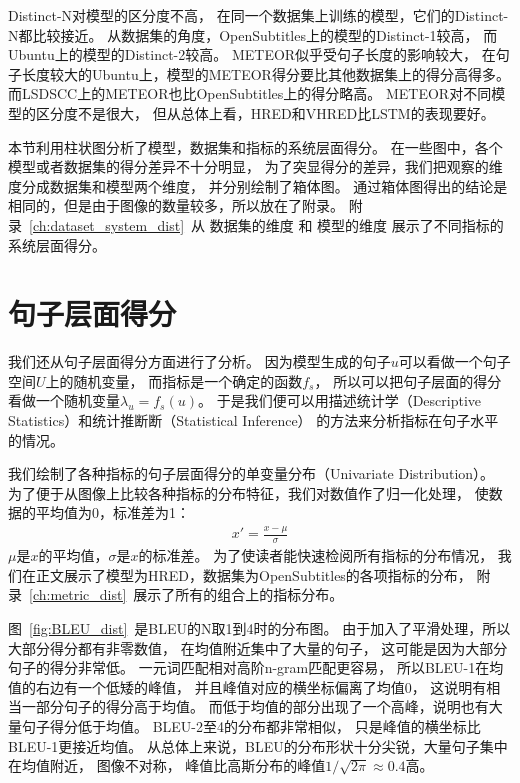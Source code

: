 Distinct-N对模型的区分度不高，
在同一个数据集上训练的模型，它们的Distinct-N都比较接近。
从数据集的角度，OpenSubtitles上的模型的Distinct-1较高，
而Ubuntu上的模型的Distinct-2较高。
METEOR似乎受句子长度的影响较大，
在句子长度较大的Ubuntu上，模型的METEOR得分要比其他数据集上的得分高得多。
而LSDSCC上的METEOR也比OpenSubtitles上的得分略高。
METEOR对不同模型的区分度不是很大，
但从总体上看，HRED和VHRED比LSTM的表现要好。

本节利用柱状图分析了模型，数据集和指标的系统层面得分。
在一些图中，各个模型或者数据集的得分差异不十分明显，
为了突显得分的差异，我们把观察的维度分成数据集和模型两个维度，
并分别绘制了箱体图。
通过箱体图得出的结论是相同的，但是由于图像的数量较多，所以放在了附录。
附录~\ref{ch:dataset_system_dist}~从
数据集的维度 和 模型的维度 展示了不同指标的系统层面得分。

\section{句子层面得分}\label{sec:utterance_scores}
我们还从句子层面得分方面进行了分析。
因为模型生成的句子$u$可以看做一个句子空间$U$上的随机变量，
而指标是一个确定的函数$f_{s}$，
所以可以把句子层面的得分看做一个随机变量$\lambda_u = f_{s}(u)$。
于是我们便可以用描述统计学（Descriptive Statistics）和统计推断断（Statistical Inference）
的方法来分析指标在句子水平的情况。

我们绘制了各种指标的句子层面得分的单变量分布（Univariate Distribution）。
为了便于从图像上比较各种指标的分布特征，我们对数值作了归一化处理，
使数据的平均值为0，标准差为1：
\begin{align}
    x' = \frac{x - \mu}{\sigma}
\end{align}
$\mu$是$x$的平均值，$\sigma$是$x$的标准差。
为了使读者能快速检阅所有指标的分布情况，
我们在正文展示了模型为HRED，数据集为OpenSubtitles的各项指标的分布，
附录~\ref{ch:metric_dist}~展示了所有的组合上的指标分布。


图~\ref{fig:BLEU_dist}~是BLEU的N取1到4时的分布图。
由于加入了平滑处理，所以大部分得分都有非零数值，
在均值附近集中了大量的句子，
这可能是因为大部分句子的得分非常低\cite{HowNot}。
一元词匹配相对高阶n-gram匹配更容易，
所以BLEU-1在均值的右边有一个低矮的峰值，
并且峰值对应的横坐标偏离了均值0，
这说明有相当一部分句子的得分高于均值。
而低于均值的部分出现了一个高峰，说明也有大量句子得分低于均值。
BLEU-2至4的分布都非常相似，
只是峰值的横坐标比BLEU-1更接近均值。
从总体上来说，BLEU的分布形状十分尖锐，大量句子集中在均值附近，
图像不对称， 峰值比高斯分布的峰值$1 / \sqrt{2 \pi} \approx 0.4$高。

